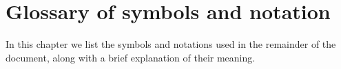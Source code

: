 %



\chapter*{Glossary of symbols and notation}

In this chapter we list the symbols and notations used in the remainder of the document,
along with a brief explanation of their meaning.

